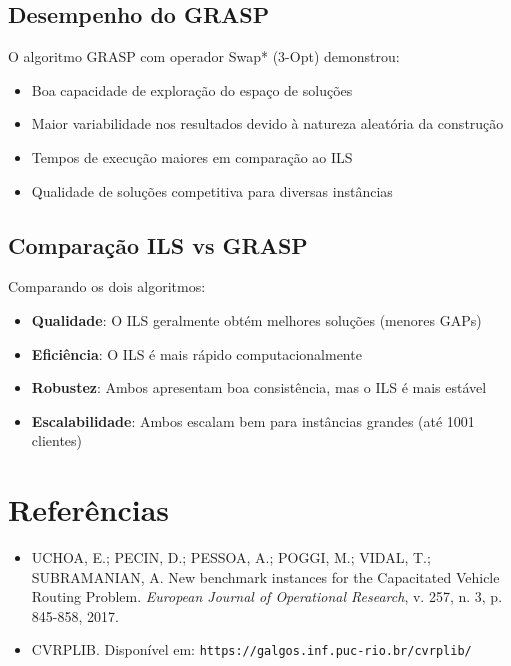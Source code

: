\documentclass[12pt,a4paper]{article}
\begin{document}
\subsection{Desempenho do GRASP}

O algoritmo GRASP com operador Swap* (3-Opt) demonstrou:

\begin{itemize}
    \item Boa capacidade de exploração do espaço de soluções
    \item Maior variabilidade nos resultados devido à natureza aleatória da construção
    \item Tempos de execução maiores em comparação ao ILS
    \item Qualidade de soluções competitiva para diversas instâncias
\end{itemize}

\subsection{Comparação ILS vs GRASP}

Comparando os dois algoritmos:

\begin{itemize}
    \item \textbf{Qualidade}: O ILS geralmente obtém melhores soluções (menores GAPs)
    \item \textbf{Eficiência}: O ILS é mais rápido computacionalmente
    \item \textbf{Robustez}: Ambos apresentam boa consistência, mas o ILS é mais estável
    \item \textbf{Escalabilidade}: Ambos escalam bem para instâncias grandes (até 1001 clientes)
\end{itemize}

\section{Referências}

\begin{itemize}
    \item UCHOA, E.; PECIN, D.; PESSOA, A.; POGGI, M.; VIDAL, T.; SUBRAMANIAN, A. New benchmark instances for the Capacitated Vehicle Routing Problem. \textit{European Journal of Operational Research}, v. 257, n. 3, p. 845-858, 2017.
    \item CVRPLIB. Disponível em: \texttt{https://galgos.inf.puc-rio.br/cvrplib/}
\end{itemize}
\end{document}
